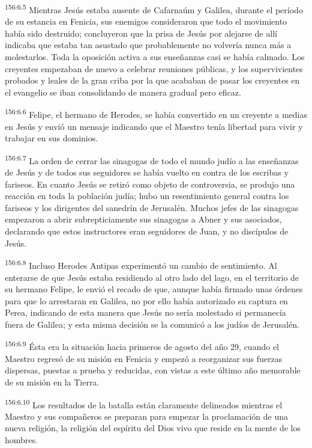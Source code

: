 \par 
\textsuperscript{156:6.5} Mientras Jesús estaba ausente de Cafarnaúm y Galilea, durante el período de su estancia en Fenicia, sus enemigos consideraron que todo el movimiento había sido destruido; concluyeron que la prisa de Jesús por alejarse de allí indicaba que estaba tan asustado que probablemente no volvería nunca más a molestarlos. Toda la oposición activa a sus enseñanzas casi se había calmado. Los creyentes empezaban de nuevo a celebrar reuniones públicas, y los supervivientes probados y leales de la gran criba por la que acababan de pasar los creyentes en el evangelio se iban consolidando de manera gradual pero eficaz.

\par 
\textsuperscript{156:6.6} Felipe, el hermano de Herodes, se había convertido en un creyente a medias en Jesús y envió un mensaje indicando que el Maestro tenía libertad para vivir y trabajar en sus dominios.

\par 
\textsuperscript{156:6.7} La orden de cerrar las sinagogas de todo el mundo judío a las enseñanzas de Jesús y de todos sus seguidores se había vuelto en contra de los escribas y fariseos. En cuanto Jesús se retiró como objeto de controversia, se produjo una reacción en toda la población judía; hubo un resentimiento general contra los fariseos y los dirigentes del sanedrín de Jerusalén. Muchos jefes de las sinagogas empezaron a abrir subrepticiamente sus sinagogas a Abner y sus asociados, declarando que estos instructores eran seguidores de Juan, y no discípulos de Jesús.

\par 
\textsuperscript{156:6.8} Incluso Herodes Antipas experimentó un cambio de sentimiento. Al enterarse de que Jesús estaba residiendo al otro lado del lago, en el territorio de su hermano Felipe, le envió el recado de que, aunque había firmado unas órdenes para que lo arrestaran en Galilea, no por ello había autorizado su captura en Perea, indicando de esta manera que Jesús no sería molestado si permanecía fuera de Galilea; y esta misma decisión se la comunicó a los judíos de Jerusalén.

\par 
\textsuperscript{156:6.9} Ésta era la situación hacia primeros de agosto del año 29, cuando el Maestro regresó de su misión en Fenicia y empezó a reorganizar sus fuerzas dispersas, puestas a prueba y reducidas, con vistas a este último año memorable de su misión en la Tierra.

\par 
\textsuperscript{156:6.10} Los resultados de la batalla están claramente delineados mientras el Maestro y sus compañeros se preparan para empezar la proclamación de una nueva religión, la religión del espíritu del Dios vivo que reside en la mente de los hombres.